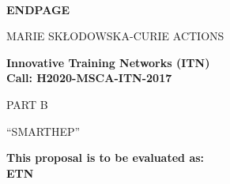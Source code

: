 \documentclass[11pt,a4paper]{article}
\def\acronym{SMARTHEP\xspace}
\begin{document}
\begin{center}

\mbox{ }\\[1ex
\vspace{1cm}]

{\LARGE\bf ENDPAGE}

\vspace{2.5cm}


{\LARGE MARIE SK\L ODOWSKA-CURIE ACTIONS}\\[2ex]

\vspace{2cm}

{\LARGE\bf Innovative Training Networks (ITN)\\
Call: H2020-MSCA-ITN-2017}\\[2ex]

\vspace{3.cm}

{\LARGE PART B}

\vspace{2.5cm}

{\LARGE ``\acronym'' }

\vspace{2.5cm}
 
{\large\bf This proposal is to be evaluated as:}\\
{\large\bf ETN}

\vspace{2.cm}

\end{center}
\end{document}
